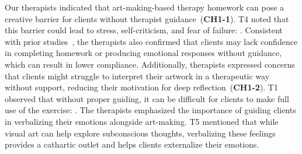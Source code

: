 Our therapists indicated that art-making-based therapy homework can pose a creative barrier for clients without therapist guidance~(\textbf{CH1-1}). T4 noted that this barrier could lead to stress, self-criticism, and fear of failure: . Consistent with prior studies~\cite{Tang2017,Harwood2007}, the therapists also confirmed that clients may lack confidence in completing homework or producing emotional responses without guidance, which can result in lower compliance.
Additionally, therapists expressed concerns that clients might struggle to interpret their artwork in a therapeutic way without support, reducing their motivation for deep reflection~(\textbf{CH1-2}). T1 observed that without proper guiding, it can be difficult for clients to make full use of the exercise: . The therapists emphasized the importance of guiding clients in verbalizing their emotions alongside art-making. T5 mentioned that while visual art can help explore subconscious thoughts, verbalizing these feelings provides a cathartic outlet and helps clients externalize their emotions.


